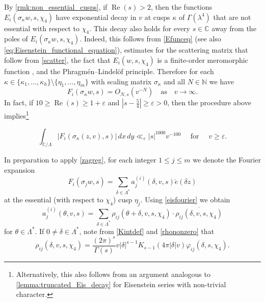 \documentclass[12pt,reqno]{amsart}
\numberwithin{equation}{section}
\renewcommand{\Re}{\operatorname{Re}}
\newcommand{\C}{\mathbb{C}}
\newcommand{\N}{\mathbb{N}}
\begin{document}
By \cref{rmk:non_essential_cusps}, if $\Re(s)>2$, then the functions $E_i(\sigma_\kappa w, s, \chi_4)$ have exponential decay in $v$ at cusps $\kappa$ of $\Gamma(\lambda^4)$ that are not essential with respect to $\chi_4$. This decay also holds for every $s\in \C$ away from the poles of $E_i(\sigma_\kappa w, s, \chi_4)$. Indeed, this follows from \eqref{Efunceq} (see also \eqref{eq:Eisenstein_functional_equation}), estimates for the scattering matrix that follow from \cref{scatter},
the fact that $E_i(w,s,\chi_4)$ is a finite-order meromorphic function \cite[Theorem~3.7.1(4)]{FriedJS},
 and the Phragm{\'e}n--Lindel{\"o}f principle. Therefore for each $\kappa \in \{\kappa_1,\ldots,\kappa_h\} \setminus \{\eta_1,\ldots,\eta_m\}$ with scaling matrix $\sigma_\kappa$ and all $N \in \N$ we have 
\begin{equation}
    F_i(\sigma_\kappa w, s) = O_{N, s}(v^{-N}) \quad \text{as} \quad v \to \infty.
\end{equation}
In fact, if $10 \geq \Re(s) \geq 1+\varepsilon$ and $|s - \frac{5}{4}| \geq \varepsilon>0$, then the procedure above implies\footnote{Alternatively, this also follows from an argument analogous to \cref{lemma:truncated_Eis_decay} for Eisenstein series with non-trivial character.} 

\begin{equation}\label{eq:non_essential_RS_bound}
    \int_{\C/\Lambda} |{F_i(\sigma_\kappa (z, v), s)}| \, dx \, dy \ll_{\varepsilon} |s|^{1000} v^{-100} \quad \text{ for }\quad v \geq \varepsilon.
\end{equation}

In preparation to apply \cref{zagreg}, for each integer $1 \leq j \leq m$ we denote the Fourier expansion
\begin{equation}\label{eq:F_i_Fourier}
    F_i(\sigma_{j}w, s) = \sum_{\delta \in \Lambda^{*}} a^{(i)}_{j}(\delta,v, s) \check{e}(\delta z)
\end{equation}
at the essential (with respect to $\chi_4$) cusp $\eta_j$. Using \eqref{eisfourier} we obtain
\begin{equation} \label{constantFexact}
    a_{j}^{(i)}(\theta,v,s) = \sum_{\delta \in \Lambda^{*} } \rho_{i j}(\theta + \delta,v,s,\chi_4) \cdot \overline{\rho_{i j}(\delta,v,s,\chi_4)}
\end{equation}
for $\theta \in \Lambda^*$. If $0 \neq \delta \in \Lambda^*$, note from \eqref{Kintdef} and \eqref{rhononzero} that 
\begin{equation} \label{rhononzerounpack}
    \rho_{i j}(\delta,v,s,\chi_4) = \frac{(2\pi)^s}{\Gamma(s)} v |{\delta}|^{s-1}  K_{s-1}(4 \pi|{\delta}| v) \varphi_{i j}(\delta,s,\chi_4).
\end{equation}
\end{document}
